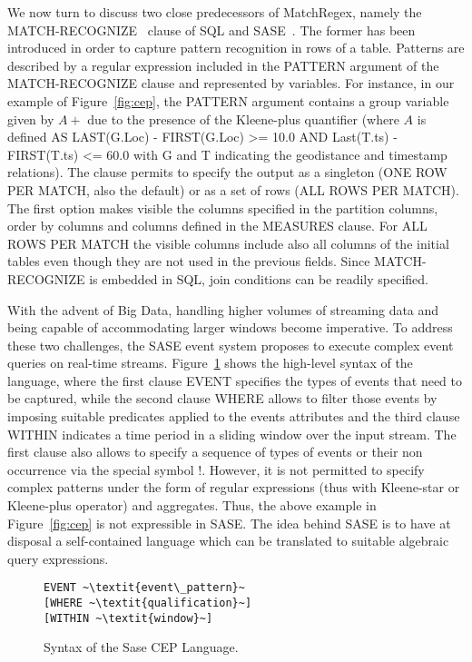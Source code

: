 We now turn to discuss two close predecessors of MatchRegex, namely the MATCH-RECOGNIZE~\cite{zemke_et_al_2007} clause of SQL and 
SASE~\cite{WuDR06}. The former has been introduced in order to capture pattern recognition in rows of a table. Patterns are described by a regular 
expression included in the PATTERN argument of the MATCH-RECOGNIZE clause and represented by variables. For instance, in our example of Figure~\ref{fig:cep}, the PATTERN argument contains a group variable given by $A+$ due to the presence of the Kleene-plus quantifier (where $A$ is defined AS
LAST(G.Loc) - FIRST(G.Loc) >= 10.0
        AND Last(T.ts) - FIRST(T.ts) <= 60.0 with G and T indicating the geodistance and timestamp relations). The clause permits to specify the output as a singleton (ONE ROW PER MATCH, also the default) or as a set of rows (ALL ROWS PER MATCH). The first option makes visible the columns specified in   the partition
columns, order by columns and columns defined in the MEASURES clause. For ALL
ROWS PER MATCH the visible columns include also all columns of the initial tables even though they are not used in the previous fields.
Since MATCH-RECOGNIZE is embedded in SQL, join conditions can be readily specified.

With the advent of Big Data, handling higher volumes of streaming data and being capable of accommodating larger windows become imperative. To address these two challenges, the SASE event system proposes to execute complex event queries on real-time streams. 
Figure~\ref{fig:SASE} shows the high-level syntax of the language, where the first clause EVENT specifies the types of events that need to be captured, while the second clause WHERE allows to filter those events by imposing suitable predicates applied to the events attributes and the third clause WITHIN indicates a time period in a sliding window over the input stream.  The first clause also allows to specify a sequence of types of events or their non occurrence 
via the special symbol $!$. However, it is not permitted to specify complex patterns under the form of regular expressions (thus with Kleene-star or Kleene-plus operator) and aggregates. Thus, the above example in Figure~\ref{fig:cep} is not expressible in SASE. The idea behind SASE is to have at disposal 
a self-contained language which can be translated to suitable algebraic query expressions. 

\begin{figure}[!h]
\begin{lstlisting}
EVENT ~\textit{event\_pattern}~
[WHERE ~\textit{qualification}~]
[WITHIN ~\textit{window}~]
\end{lstlisting}
\vspace*{-4mm}
\caption{\label{fig:SASE}Syntax of the Sase CEP Language.}
\end{figure}
